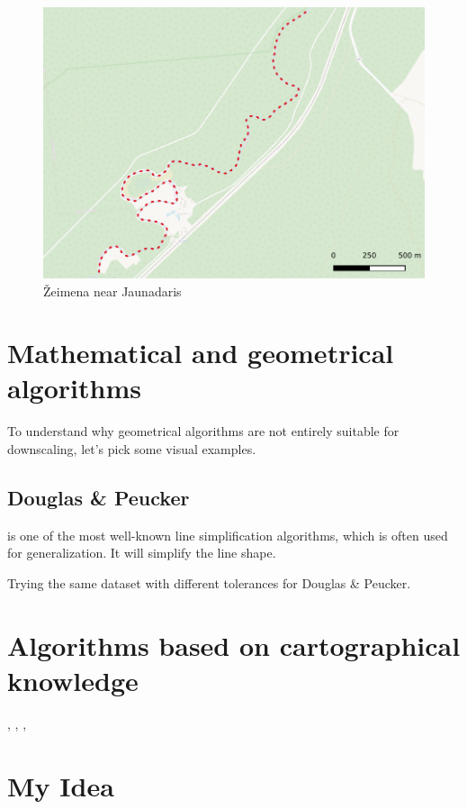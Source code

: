 \documentclass{article}
\begin{document}
\begin{figure}
    \centering
    \includegraphics[width=148mm]{zeimena}
    \caption{Žeimena near Jaunadaris}
    \label{fig:zeimena}
\end{figure}

\section{Mathematical and geometrical algorithms}

To understand why geometrical algorithms are not entirely suitable for 
downscaling, let's pick some visual examples.

\subsection{Douglas \& Peucker}

\cite{douglas1973algorithms} is one of the most well-known line simplification
algorithms, which is often used for generalization. It will simplify the line shape.

Trying the same dataset with different tolerances for Douglas \& Peucker.

\section{Algorithms based on cartographical knowledge}

\cite{jiang2003line}, \cite{dyken2009simultaneous},
\cite{mustafa2006dynamic}, \cite{nollenburg2008morphing}

\section{My Idea}
\label{sec:my_idea}
\end{document}
